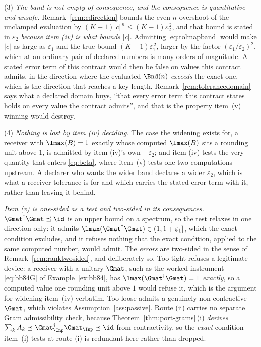 \begin{remark}
(3) \emph{The band is not empty of consequence, and the consequence is
quantitative and unsafe.} Remark~\ref{rem:cdirection} bounds the even-$n$
overshoot of the unclamped evaluation by
$(K-1)|c|^{\,n}\le(K-1)\varepsilon_2^{\,2}$, and that bound is stated in
$\varepsilon_2$ \emph{because item (iv) is what bounds $|c|$}. Admitting
\eqref{eq:tolmapband} would make $|c|$ as large as $\varepsilon_1$ and the
true bound $(K-1)\varepsilon_1^{\,2}$, larger by the factor
$(\varepsilon_1/\varepsilon_2)^2$, which at an ordinary pair of declared
numbers is many orders of magnitude. A stated error term of this contract
would then be false on values this contract admits, in the direction where
the evaluated $\Bnd(n)$ \emph{exceeds} the exact one, which is the direction
that reaches a key length. Remark~\ref{rem:tolerancedomain} says what a
declared domain buys, ``that every error term this contract states holds on
every value the contract admits'', and that is the property item~(v) winning
would destroy.

(4) \emph{Nothing is lost by item (iv) deciding.} The case the widening exists
for, a receiver with $\lmax(B)=1$ exactly whose computed $\lmax(B)$ sits a
rounding unit above $1$, is admitted by item (iv)'s own $-\varepsilon_2$; and item (iv) tests the
very quantity that enters \eqref{eq:beta}, where item~(v) tests one two
computations upstream. A declarer who wants the wider band declares a wider
$\varepsilon_2$, which is what a receiver tolerance is for and which carries
the stated error term with it, rather than leaving it behind.

\emph{Item (v) is one-sided as a test and two-sided in its consequences.}
$\Gmat^\dagger\Gmat\preceq\id$ is an upper bound on a spectrum, so the test
relaxes in one direction only: it admits
$\lmax(\Gmat^\dagger\Gmat)\in(1,1+\varepsilon_1]$, which the exact condition
excludes, and it refuses nothing that the exact condition, applied to the same
computed number, would admit. The \emph{errors} are two-sided in the sense of
Remark~\ref{rem:ranktwosided}, and deliberately so. Too tight refuses a
legitimate device: a receiver with a unitary $\Gmat$, such as the worked
instrument \eqref{eq:bb84G} of Example~\ref{ex:bb84}, has
$\lmax(\Gmat^\dagger\Gmat)=1$ \emph{exactly}, so a computed value one rounding unit above
$1$ would refuse it, which is the argument for widening item~(iv) verbatim.
Too loose admits a genuinely non-contractive $\Gmat$, which violates
Assumption~\ref{ass:passive}. Route (ii) carries no separate Gram
admissibility check, because Theorem~\ref{thm:port-grams}\,(i) \emph{derives}
$\sum_kA_k\preceq\Gmat_{\Inp}^\dagger\Gmat_{\Inp}\preceq\id$ from
contractivity, so the \emph{exact} condition item~(i) tests at route (i) is
redundant here rather than dropped.


\end{remark}
